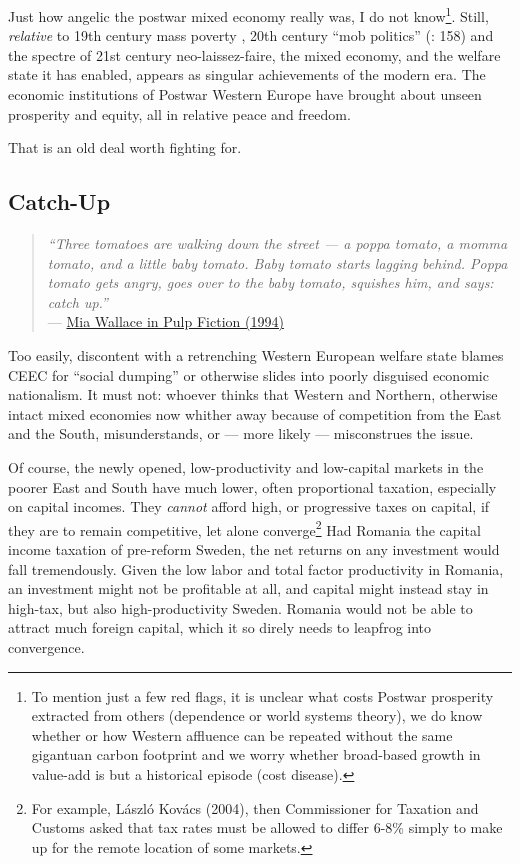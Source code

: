 Just how angelic the postwar mixed economy really was, I do not know\footnote{
	To mention just a few red flags, it is unclear what costs Postwar prosperity extracted from others (dependence or world systems theory), we do know whether or how Western affluence can be repeated without the same gigantuan carbon footprint and we worry whether broad-based growth in value-add is but a historical episode (cost disease).}. 
Still, \emph{relative} to 19th century mass poverty \citep{MarxEngels-1848-aa}, 20th century ``mob politics'' (\citealt{Crouch2004}: 158) and the spectre of 21st century neo-laissez-faire, the mixed economy, and the welfare state it has enabled, appears as singular achievements of the modern era. The economic institutions of Postwar Western Europe have brought about unseen prosperity and equity, all in relative peace and freedom. 

That is an old deal worth fighting for.

\subsection{Catch-Up}
\begin{quote}
	\emph{``Three tomatoes are walking down the street --- a poppa tomato, a momma tomato, and a little baby tomato. Baby tomato starts lagging behind. Poppa tomato gets angry, goes over to the baby tomato, squishes him, and says: catch up.''} \\
	--- \href{http://www.youtube.com/watch?v=5D-QKY0-Bxk}{Mia Wallace in Pulp Fiction (1994)}
\end{quote}

Too easily, discontent with a retrenching Western European welfare state blames \gls{CEEC} for ``social dumping'' %
or otherwise slides into poorly disguised economic nationalism. 
It must not: whoever thinks that Western and Northern, otherwise intact mixed economies now whither away because of competition from the East and the South, misunderstands, or --- more likely --- misconstrues the issue.

Of course, the newly opened, low-productivity and low-capital markets in the poorer East and South have much lower, often proportional taxation, especially on capital incomes. They \emph{cannot} afford high, or progressive taxes on capital, if they are to remain competitive, let alone converge\footnote{
	For example, L\'{a}szl\'{o} Kov\'{a}cs (2004), then Commissioner for Taxation and Customs asked that tax rates must be allowed to differ 6-8\% simply to make up for the remote location of some markets.} 
Had Romania the capital income taxation of pre-reform Sweden, the net returns on any investment would fall tremendously. Given the low labor and total factor productivity in Romania, an investment might not be profitable at all, and capital might instead stay in high-tax, but also high-productivity Sweden. Romania would not be able to attract much foreign capital, which it so direly needs to leapfrog into convergence.
	
